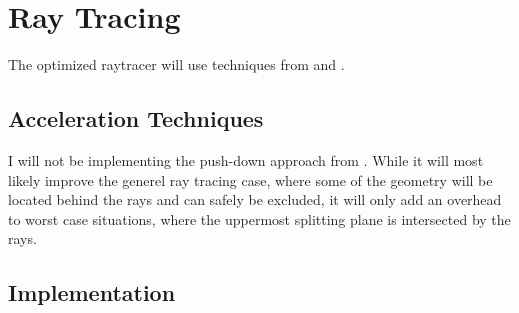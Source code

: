 \chapter{Ray Tracing}





The optimized raytracer will use techniques from 
and .



\section{Acceleration Techniques}


I will not be implementing the push-down approach from
. While it will most likely improve the generel ray
tracing case, where some of the geometry will be located behind the
rays and can safely be excluded, it will only add an overhead to worst
case situations, where the uppermost splitting plane is intersected by
the rays.






\section{Implementation}




